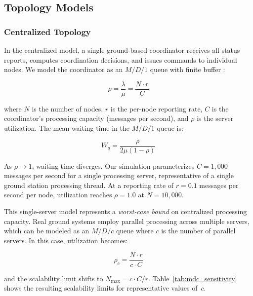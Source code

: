 \documentclass[journal]{IEEEtran}
\begin{document}
\subsection{Topology Models}

\subsubsection{Centralized Topology}

In the centralized model, a single ground-based coordinator receives all status reports, computes coordination decisions, and issues commands to individual nodes. We model the coordinator as an $M/D/1$ queue with finite buffer \cite{kleinrock_queueing}:

\begin{equation}
    \rho = \frac{\lambda}{\mu} = \frac{N \cdot r}{C}
    \label{eq:centralized_utilization}
\end{equation}

\noindent where $N$ is the number of nodes, $r$ is the per-node reporting rate, $C$ is the coordinator's processing capacity (messages per second), and $\rho$ is the server utilization. The mean waiting time in the $M/D/1$ queue is:

\begin{equation}
    W_q = \frac{\rho}{2\mu(1 - \rho)}
    \label{eq:md1_waiting}
\end{equation}

As $\rho \to 1$, waiting time diverges. Our simulation parameterizes $C = 1{,}000$ messages per second for a single processing server, representative of a single ground station processing thread. At a reporting rate of $r = 0.1$ messages per second per node, utilization reaches $\rho = 1.0$ at $N = 10{,}000$.

This single-server model represents a \emph{worst-case bound} on centralized processing capacity. Real ground systems employ parallel processing across multiple servers, which can be modeled as an $M/D/c$ queue where $c$ is the number of parallel servers. In this case, utilization becomes:

\begin{equation}
    \rho_c = \frac{N \cdot r}{c \cdot C}
    \label{eq:mdc_utilization}
\end{equation}

\noindent and the scalability limit shifts to $N_{\max} = c \cdot C / r$. Table~\ref{tab:mdc_sensitivity} shows the resulting scalability limits for representative values of~$c$.
\end{document}

